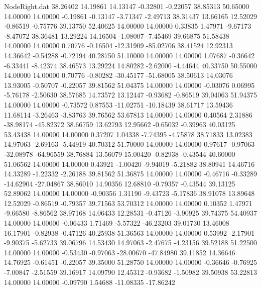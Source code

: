 \begin{filecontents}{NodeRight.dat}
  38.26402   14.19861   14.13147    -0.32801   -0.22057   38.85313   50.65000   14.00000   14.00000   -0.19861   -0.13147   -3.71347   -2.49713
  38.31437   13.66165   12.52029    -0.86519   -0.75776   39.13750   52.40625   14.00000   14.00000    0.33835    1.47971   -9.67173   -8.47072
  38.36481   13.29224   14.16504    -1.08007   -7.45469   39.66875   51.58438   14.00000   14.00000    0.70776   -0.16504  -12.31909  -85.02706
  38.41524   12.92313   14.36642    -0.54288   -0.72194   40.28750   51.10000   14.00000   14.00000    1.07687   -0.36642   -6.33441   -8.42374
  38.46573   13.29224   14.80282    -2.62000   -4.44644   40.33750   50.55000   14.00000   14.00000    0.70776   -0.80282  -30.45177  -51.68005
  38.50613   14.03076   13.93005    -0.50707   -0.22057   39.81562   51.04375   14.00000   14.00000   -0.03076    0.06995   -5.76178   -2.50630
  38.57685   14.73572   13.12447    -0.93682   -0.86519   39.04063   51.94375   14.00000   14.00000   -0.73572    0.87553  -11.02751  -10.18439
  38.61717   13.59436   11.68114    -3.26463   -3.83763   39.76562   53.67813   14.00000   14.00000    0.40564    2.31886  -38.98174  -45.82372
  38.66759   13.62793   12.95662    -0.65032   -0.39963   40.03125   53.43438   14.00000   14.00000    0.37207    1.04338   -7.74395   -4.75878
  38.71833   13.02383   14.97063    -2.69163   -5.44919   40.70312   51.70000   14.00000   14.00000    0.97617   -0.97063  -32.08978  -64.96559
  38.76884   13.56079   15.00420    -0.82938   -0.43544   40.60000   51.06562   14.00000   14.00000    0.43921   -1.00420   -9.94019   -5.21882
  38.80941   14.46716   14.33289    -1.22332   -2.26188   39.81562   51.36875   14.00000   14.00000   -0.46716   -0.33289  -14.62904  -27.04867
  38.86010   14.90356   12.68810    -0.79357   -0.43544   39.13125   52.89062   14.00000   14.00000   -0.90356    1.31190   -9.43723   -5.17836
  38.91078   13.89648   12.52029    -0.86519   -0.79357   39.71563   53.70312   14.00000   14.00000    0.10352    1.47971   -9.66580   -8.86562
  38.97168   14.06433   12.28531    -0.47126   -3.90925   39.74375   54.40937   14.00000   14.00000   -0.06433    1.71469   -5.57322  -46.23203
  39.01730   13.46008   16.17901    -0.82938   -0.47126   40.25938   51.36563   14.00000   14.00000    0.53992   -2.17901   -9.90375   -5.62733
  39.06796   14.53430   14.97063    -2.47675   -4.23156   39.52188   51.22500   14.00000   14.00000   -0.53430   -0.97063  -28.00670  -47.84980
  39.11852   14.36646   14.76925    -0.61451   -0.22057   39.35000   51.28750   14.00000   14.00000   -0.36646   -0.76925   -7.00847   -2.51559
  39.16917   14.09790   12.45312    -0.93682   -1.50982   39.50938   53.22813   14.00000   14.00000   -0.09790    1.54688  -11.08335  -17.86242

\end{filecontents}
